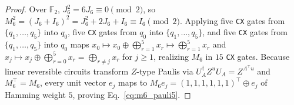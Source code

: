 \documentclass[aps,prapplied,reprint,longbibliography]{revtex4-2}
\begin{document}
\begin{proof}
Over $\mathbb{F}_2$, $J_6^2 = 6 J_6 \equiv 0 \pmod 2$, so $M_6^2 = (J_6 + I_6)^2 = J_6^2 + 2 J_6 + I_6 \equiv I_6 \pmod 2$. Applying five \texttt{CX} gates from $\{q_1,\dots,q_5\}$ into $q_0$, five \texttt{CX} gates from $q_0$ into $\{q_1,\dots,q_5\}$, and five \texttt{CX} gates from $\{q_1,\dots,q_5\}$ into $q_0$ maps $x_0 \mapsto x_0 \oplus \bigoplus_{r=1}^5 x_r \mapsto \bigoplus_{r=1}^5 x_r$ and $x_j \mapsto x_j \oplus \bigoplus_{r=0}^5 x_r = \bigoplus_{r \ne j} x_r$ for $j \ge 1$, realizing $M_6$ in $15$ \texttt{CX} gates. Because linear reversible circuits transform $Z$-type Paulis via $U_A^\dagger Z^u U_A = Z^{A^\top u}$ and $M_6^\top = M_6$, every unit vector $e_j$ maps to $M_6 e_j = (1,1,1,1,1,1)^\top \oplus e_j$ of Hamming weight $5$, proving Eq.~\eqref{eq:m6_pauli5}.
\end{proof}
\end{document}

